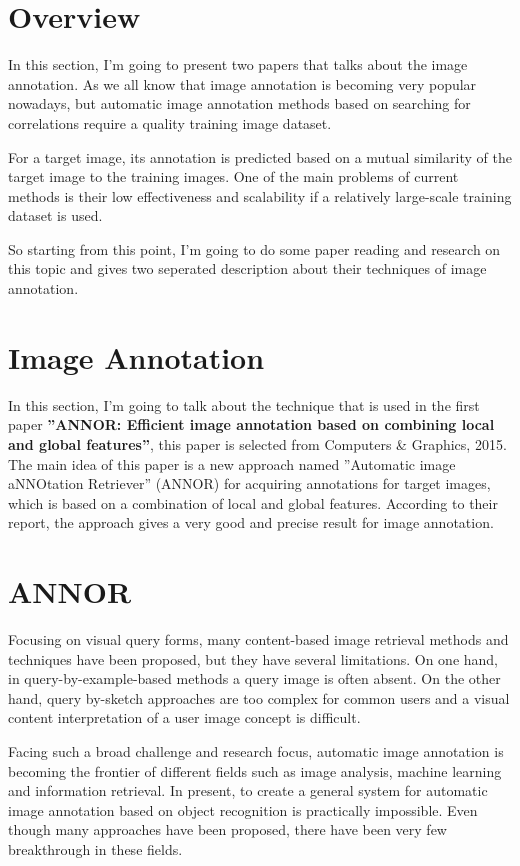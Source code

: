 \documentclass[pdftex,12pt,a4paper]{article}
\begin{document}


\section{Overview}

In this section, I'm going to present two papers that talks about the image annotation. As we
all know that image annotation is becoming very popular nowadays, but automatic image annotation methods based on searching for correlations require a quality training image dataset. 

For a target image, its annotation is predicted based on a mutual similarity of the target image to the training images. One of the main problems of current methods is their low effectiveness and scalability if a relatively large-scale training dataset is used.

So starting from this point, I'm going to do some paper reading and research on this topic and gives two seperated
description about their techniques of image annotation.

\section{Image Annotation}
In this section, I'm going to talk about the technique that is used in the first paper \textbf{''ANNOR: Efficient image annotation based on combining local and global features''}, this paper is selected from Computers \& Graphics, 2015. The main idea of this paper is a new approach named
''Automatic image aNNOtation Retriever'' (ANNOR) for acquiring annotations for target images, which is
based on a combination of local and global features. According to their report, the approach gives a very good and precise result for image annotation.

\section{ANNOR}
Focusing on visual query forms, many content-based image retrieval methods and techniques have been proposed,
but they have several limitations. On one hand, in query-by-example-based
methods a query image is often absent. On the other hand, query by-sketch
approaches are too complex for common users and
a visual content interpretation of a user image concept is difficult.

Facing such a broad challenge and research focus, automatic image annotation is becoming the frontier of 
different fields such as image analysis, machine learning and information retrieval. In
present, to create a general system for automatic image annotation
based on object recognition is practically impossible. Even though many approaches have been proposed, there
have been very few breakthrough in these fields.
\end{document}
